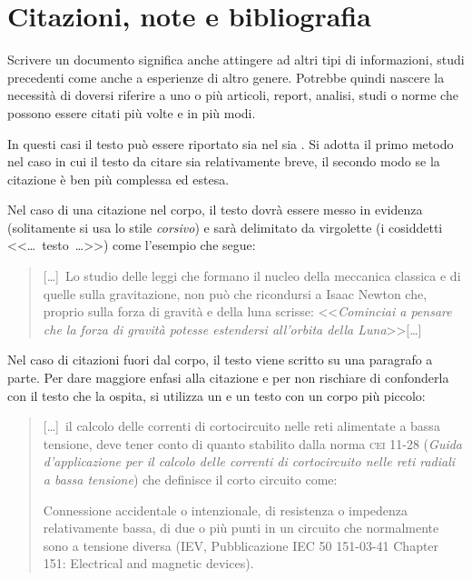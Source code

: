 						\section{Citazioni, note e bibliografia}

Scrivere un documento significa anche attingere ad altri tipi di informazioni, studi precedenti come anche a esperienze di altro genere. Potrebbe quindi nascere la necessità di doversi riferire a uno o più articoli, report, analisi, studi o norme che possono essere citati più volte e in più modi.

In questi casi il testo può essere riportato sia nel  sia . Si adotta il primo metodo nel caso in cui il testo da citare sia relativamente breve, il secondo modo se la citazione è ben più complessa ed estesa.

Nel caso di una citazione nel corpo, il testo dovrà essere messo in evidenza (solitamente si usa lo stile \textit{corsivo}) e sarà delimitato da virgolette (i cosiddetti  
<<\ldots~testo~\ldots>>) come l'esempio che segue:

\begin{quote}\small
[\ldots]~Lo studio delle leggi che formano il nucleo della meccanica classica e di quelle sulla gravitazione, non può che ricondursi a Isaac Newton che, proprio sulla forza di gravità e della luna scrisse: <<\emph{Cominciai a pensare che la forza di gravità potesse estendersi all'orbita della Luna}>>[\ldots]
\end{quote}

Nel caso di citazioni fuori dal corpo, il testo viene scritto su una paragrafo a parte. Per dare maggiore enfasi alla citazione e per non rischiare di confonderla con il testo che la ospita, si utilizza un  e un testo con un corpo più piccolo:

\begin{quote}\small
[\ldots]~il calcolo delle correnti di cortocircuito nelle reti alimentate a bassa tensione, deve tener conto di quanto stabilito dalla norma \textsc{cei 11-28} (\textit{Guida d'applicazione per il calcolo delle correnti di cortocircuito nelle reti radiali a bassa tensione}) che definisce il corto circuito come:
		\vspace{-5pt}\begin{changemargin}{5mm}{5mm}\footnotesize
      Connessione accidentale o intenzionale, di resistenza o impedenza relativamente bassa, di due o più punti in un circuito che normalmente sono a tensione diversa (IEV, Pubblicazione IEC 50 151-03-41 Chapter 151: Electrical and magnetic devices).
		\end{changemargin}
\end{quote}\vspace{-5pt}

